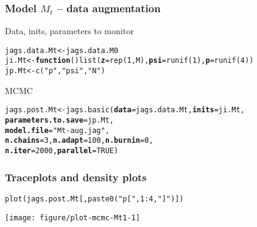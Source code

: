 \documentclass[color=usenames,dvipsnames]{beamer}\usepackage[]{graphicx}\usepackage[]{color}
\makeatletter
\newcommand{\hlnum}[1]{\textcolor[rgb]{0.69,0.494,0}{#1}}%
\newcommand{\hlstr}[1]{\textcolor[rgb]{0.749,0.012,0.012}{#1}}%
\newcommand{\hlopt}[1]{\textcolor[rgb]{0,0,0}{#1}}%
\newcommand{\hlstd}[1]{\textcolor[rgb]{0,0,0}{#1}}%
\newcommand{\hlkwa}[1]{\textcolor[rgb]{0,0,0}{\textbf{#1}}}%
\newcommand{\hlkwb}[1]{\textcolor[rgb]{0,0.341,0.682}{#1}}%
\newcommand{\hlkwc}[1]{\textcolor[rgb]{0,0,0}{\textbf{#1}}}%
\newcommand{\hlkwd}[1]{\textcolor[rgb]{0.004,0.004,0.506}{#1}}%
\newenvironment{kframe}{%
 \def\at@end@of@kframe{}%
 \ifinner\ifhmode%
  \def\at@end@of@kframe{\end{minipage}}%
  \begin{minipage}{\columnwidth}%
 \fi\fi%
 \def\FrameCommand##1{\hskip\@totalleftmargin \hskip-\fboxsep
 \colorbox{shadecolor}{##1}\hskip-\fboxsep
     \hskip-\linewidth \hskip-\@totalleftmargin \hskip\columnwidth}%
 \MakeFramed {\advance\hsize-\width
   \@totalleftmargin\z@ \linewidth\hsize
   \@setminipage}}%
 {\par\unskip\endMakeFramed%
 \at@end@of@kframe}
\newenvironment{knitrout}{}{} %
\makeatother
\begin{document}
\begin{frame}[fragile]
  \frametitle{Model $M_t$ -- data augmentation}
  Data, inits, parameters to monitor
\begin{knitrout}\scriptsize
{}\color{fgcolor}\begin{kframe}
\begin{alltt}
\hlstd{jags.data.Mt} \hlkwb{<-} \hlstd{jags.data.M0}
\hlstd{ji.Mt} \hlkwb{<-} \hlkwa{function}\hlstd{()} \hlkwd{list}\hlstd{(}\hlkwc{z}\hlstd{=}\hlkwd{rep}\hlstd{(}\hlnum{1}\hlstd{,M),} \hlkwc{psi}\hlstd{=}\hlkwd{runif}\hlstd{(}\hlnum{1}\hlstd{),} \hlkwc{p}\hlstd{=}\hlkwd{runif}\hlstd{(}\hlnum{4}\hlstd{))}
\hlstd{jp.Mt} \hlkwb{<-} \hlkwd{c}\hlstd{(}\hlstr{"p"}\hlstd{,} \hlstr{"psi"}\hlstd{,} \hlstr{"N"}\hlstd{)}
\end{alltt}
\end{kframe}
\end{knitrout}
\pause
\vfill
MCMC
\begin{knitrout}\scriptsize
{}\color{fgcolor}\begin{kframe}
\begin{alltt}
\hlstd{jags.post.Mt} \hlkwb{<-} \hlkwd{jags.basic}\hlstd{(}\hlkwc{data}\hlstd{=jags.data.Mt,} \hlkwc{inits}\hlstd{=ji.Mt,}
                           \hlkwc{parameters.to.save}\hlstd{=jp.Mt,}
                           \hlkwc{model.file}\hlstd{=}\hlstr{"Mt-aug.jag"}\hlstd{,}
                           \hlkwc{n.chains}\hlstd{=}\hlnum{3}\hlstd{,} \hlkwc{n.adapt}\hlstd{=}\hlnum{100}\hlstd{,} \hlkwc{n.burnin}\hlstd{=}\hlnum{0}\hlstd{,}
                           \hlkwc{n.iter}\hlstd{=}\hlnum{2000}\hlstd{,} \hlkwc{parallel}\hlstd{=}\hlnum{TRUE}\hlstd{)}
\end{alltt}
\end{kframe}
\end{knitrout}
\end{frame}






\begin{frame}[fragile]
  \frametitle{Traceplots and density plots}
\begin{knitrout}\footnotesize
{}\color{fgcolor}\begin{kframe}
\begin{alltt}
\hlkwd{plot}\hlstd{(jags.post.Mt[,}\hlkwd{paste0}\hlstd{(}\hlstr{"p["}\hlstd{,} \hlnum{1}\hlopt{:}\hlnum{4}\hlstd{,} \hlstr{"]"}\hlstd{)])}
\end{alltt}
\end{kframe}

{\centering \texttt{[image: figure/plot-mcmc-Mt1-1]} 

}



\end{knitrout}
\end{frame}
\end{document}
